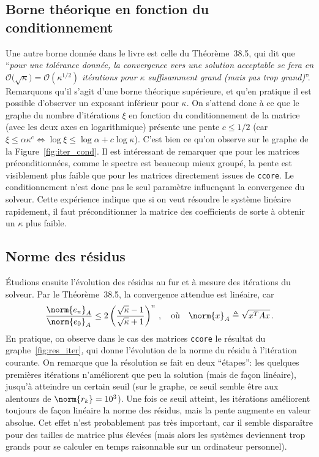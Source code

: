\documentclass[11pt]{article}
\begin{document}
\subsection{Borne théorique en fonction du conditionnement}
Une autre borne donnée dans le livre est celle du Théorème~38.5, qui dit que \foreignquote{french}{\emph{pour une tolérance donnée, la convergence vers une solution acceptable se fera en $\mathcal{O}\big(\sqrt{\kappa}\big) = \mathcal{O}(\kappa^{1/2})$ itérations pour $\kappa$ suffisamment grand (mais pas trop grand)}}. Remarquons qu'il s'agit d'une borne théorique supérieure, et qu'en pratique il est possible d'observer un exposant inférieur pour $\kappa$. On s'attend donc à ce que le graphe du nombre d'itérations $\xi$ en fonction du conditionnement de la matrice (avec les deux axes en logarithmique) présente une pente $c \le 1/2$ (car $\xi \le \alpha \kappa^{c} \iff \log \xi \le \log \alpha + c \log \kappa$). C'est bien ce qu'on observe sur le graphe de la Figure~\ref{fig:iter_cond}. Il est intéressant de remarquer que pour les matrices préconditionnées, comme le spectre est beaucoup mieux groupé, la pente est visiblement plus faible que pour les matrices directement issues de \texttt{ccore}. Le conditionnement n'est donc pas le seul paramètre influençant la convergence du solveur. Cette expérience indique que si on veut résoudre le système linéaire rapidement, il faut préconditionner la matrice des coefficients de sorte à obtenir un $\kappa$ plus faible.

\subsection{Norme des résidus}
Étudions ensuite l'évolution des résidus au fur et à mesure des itérations du solveur. Par le Théorème~38.5, la convergence attendue est linéaire, car
\[
\frac{\norm{e_n}_A}{\norm{e_0}_A} \le 2 \left(\frac{\sqrt{\kappa}-1}{\sqrt{\kappa}+1}\right)^n\,, \quad \textnormal{où} \quad \norm{x}_{A} \triangleq \sqrt{x^T A x}\,.
\]
En pratique, on observe dans le cas des matrices \texttt{ccore} le résultat du graphe~\ref{fig:res_iter}, qui donne l'évolution de la norme du résidu à l'itération courante. On remarque que la résolution se fait en deux \foreignquote{french}{étapes}: les quelques premières itérations n'améliorent que peu la solution (mais de façon linéaire), jusqu'à atteindre un certain seuil (sur le graphe, ce seuil semble être aux alentours de $\norm{r_k} = 10^3$). Une fois ce seuil atteint, les itérations améliorent toujours de façon linéaire la norme des résidus, mais la pente augmente en valeur absolue. Cet effet n'est probablement pas très important, car il semble disparaître pour des tailles de matrice plus élevées (mais alors les systèmes deviennent trop grands pour se calculer en temps raisonnable sur un ordinateur personnel).
\end{document}
